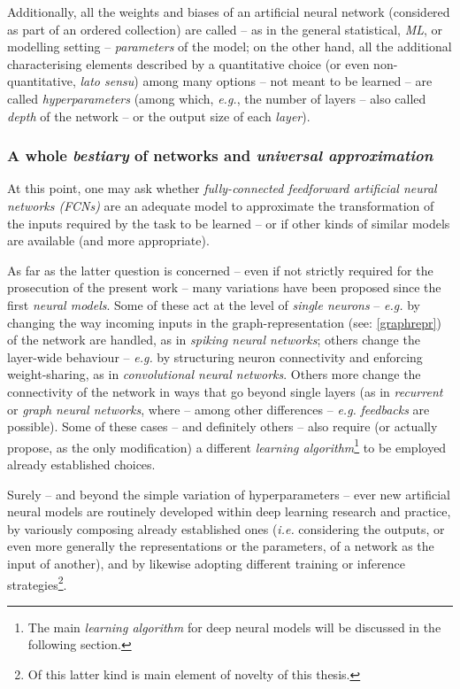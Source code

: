 Additionally, all the weights and biases of an artificial neural network (considered as part of an ordered collection) are called -- as in the general statistical, \textit{ML}, or modelling setting -- \textit{parameters} of the model; on the other hand, all the additional characterising elements described by a quantitative choice (or even non-quantitative, \textit{lato sensu}) among many options -- not meant to be learned -- are called \textit{hyperparameters} (among which, \textit{e.g.}, the number of layers -- also called \textit{depth} of the network -- or the output size of each \textit{layer}).

\subsubsection{A whole \textit{bestiary} of networks and \textit{universal approximation}}

At this point, one may ask whether \textit{fully-connected feedforward artificial neural networks (FCNs)} are an adequate model to approximate the transformation of the inputs required by the task to be learned -- or if other kinds of similar models are available (and more appropriate).

As far as the latter question is concerned -- even if not strictly required for the prosecution of the present work -- many variations have been proposed since the first \textit{neural models}. Some of these act at the level of \textit{single neurons} -- \textit{e.g.} by changing the way incoming inputs in the graph-representation (see: {\ref{graphrepr}}) of the network are handled, as in \textit{spiking neural networks}; others change the layer-wide behaviour -- \textit{e.g.} by structuring neuron connectivity and enforcing weight-sharing, as in \textit{convolutional neural networks}. Others more change the connectivity of the network in ways that go beyond single layers (as in \textit{recurrent} or \textit{graph} \textit{neural networks}, where -- among other differences -- \textit{e.g.} \textit{feedbacks} are possible). Some of these cases -- and definitely others -- also require (or actually propose, as the only modification) a different \textit{learning algorithm}\footnote{The main \textit{learning algorithm} for deep neural models will be discussed in the following section.} to be employed \wrt already established choices.

Surely -- and beyond the simple variation of hyperparameters -- ever new artificial neural models are routinely developed within deep learning research and practice, by variously composing already established ones (\textit{i.e.} considering the outputs, or even more generally the representations or the parameters, of a network as the input of another), and by likewise adopting different training or inference strategies\footnote{Of this latter kind is main element of novelty of this thesis.}.

